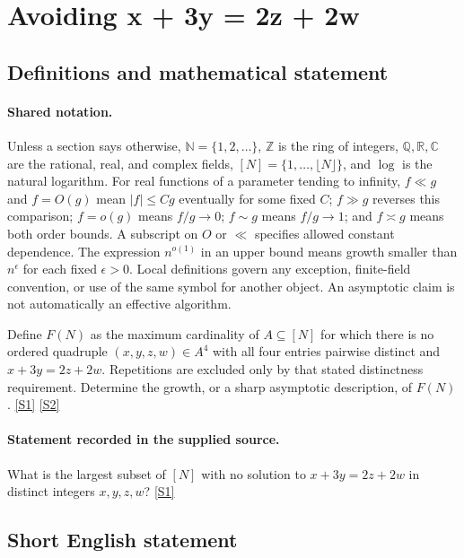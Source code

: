 \documentclass[11pt,a4paper]{article}
\newcommand{\N}{\mathbb{N}}
\newcommand{\Z}{\mathbb{Z}}
\newcommand{\Q}{\mathbb{Q}}
\newcommand{\R}{\mathbb{R}}
\newcommand{\C}{\mathbb{C}}
\newcommand{\sref}[2]{\hyperlink{source:#1:#2}{[S#2]}}
\begin{document}
\section{Avoiding x + 3y = 2z + 2w}\label{statement}


\subsection{Definitions and mathematical statement}

\paragraph{Shared notation.}Unless a section says otherwise, $\N=\{1,2,\ldots\}$,
$\Z$ is the ring of integers, $\Q,\R,\C$ are the rational, real, and complex
fields, $[N]=\{1,\ldots,\lfloor N\rfloor\}$, and $\log$ is the natural
logarithm. For real functions of a parameter tending to infinity,
$f\ll g$ and $f=O(g)$ mean $|f|\leq Cg$ eventually for some fixed $C$;
$f\gg g$ reverses this comparison; $f=o(g)$ means $f/g\to0$;
$f\sim g$ means $f/g\to1$; and $f\asymp g$ means both order bounds.
A subscript on $O$ or $\ll$ specifies allowed constant dependence.
The expression $n^{o(1)}$ in an upper bound means growth smaller than
$n^\epsilon$ for each fixed $\epsilon>0$. Local definitions govern any
exception, finite-field convention, or use of the same symbol for another
object. An asymptotic claim is not automatically an effective algorithm.



Define $F(N)$ as the maximum cardinality of $A\subseteq[N]$ for which there is no ordered quadruple $(x,y,z,w)\in A^4$ with all four entries pairwise distinct and $x+3y=2z+2w$. Repetitions are excluded only by that stated distinctness requirement. Determine the growth, or a sharp asymptotic description, of $F(N)$. \sref{statement}{1} \sref{statement}{2}

\paragraph{Statement recorded in the supplied source.}
What is the largest subset of $[N]$ with no solution to $x + 3y = 2z + 2w$ in distinct integers $x, y, z, w$? \sref{statement}{1}

\subsection{Short English statement}
\end{document}
